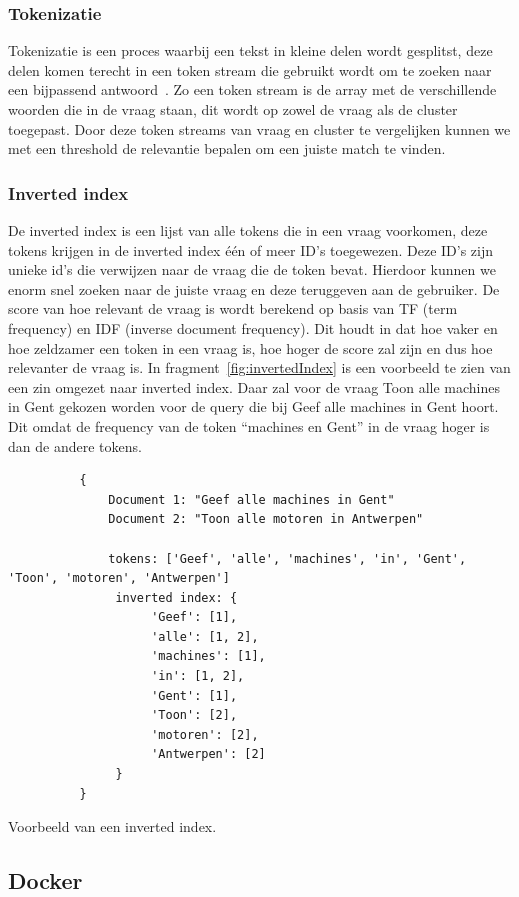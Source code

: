 \subsubsection{Tokenizatie}
Tokenizatie is een proces waarbij een tekst in kleine delen wordt gesplitst, deze delen komen terecht in een token stream die gebruikt wordt om te zoeken naar een bijpassend antwoord~\autocite{Kathare2021}.
Zo een token stream is de array met de verschillende woorden die in de vraag staan, dit wordt op zowel de vraag als de cluster toegepast.
Door deze token streams van vraag en cluster te vergelijken kunnen we met een threshold de relevantie bepalen om een juiste match te vinden.

\subsubsection{Inverted index}
De inverted index is een lijst van alle tokens die in een vraag voorkomen, deze tokens krijgen in de inverted index één of meer ID's toegewezen.
Deze ID's zijn unieke id's die verwijzen naar de vraag die de token bevat. Hierdoor kunnen we enorm snel zoeken naar de juiste vraag en deze teruggeven aan de gebruiker.
De score van hoe relevant de vraag is wordt berekend op basis van TF (term frequency) en IDF (inverse document frequency).
Dit houdt in dat hoe vaker en hoe zeldzamer een token in een vraag is, hoe hoger de score zal zijn en dus hoe relevanter de vraag is.
In fragment~\ref{fig:invertedIndex} is een voorbeeld te zien van een zin omgezet naar inverted index. 
Daar zal voor de vraag Toon alle machines in Gent gekozen worden voor de query die bij Geef alle machines in Gent hoort.
Dit omdat de frequency van de token ``machines en Gent'' in de vraag hoger is dan de andere tokens.

\begin{listing}[H]
     \begin{verbatim}
          {
              Document 1: "Geef alle machines in Gent"
              Document 2: "Toon alle motoren in Antwerpen"

              tokens: ['Geef', 'alle', 'machines', 'in', 'Gent', 'Toon', 'motoren', 'Antwerpen']
               inverted index: {
                    'Geef': [1],
                    'alle': [1, 2],
                    'machines': [1],
                    'in': [1, 2],
                    'Gent': [1],
                    'Toon': [2],
                    'motoren': [2],
                    'Antwerpen': [2]
               }
          }
     \end{verbatim}
     \caption[Voorbeeld inverted index]{\label{fig:invertedIndex}Voorbeeld van een inverted index.}
\end{listing}

\subsection{Docker}

